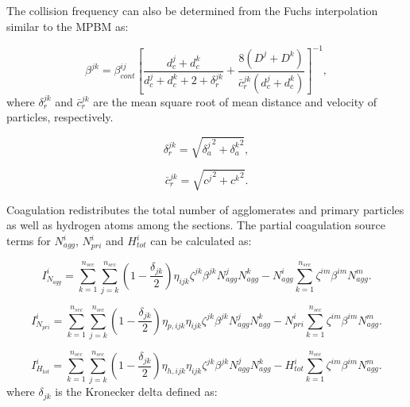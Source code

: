The collision frequency can also be determined from the Fuchs interpolation similar to the MPBM as:

\begin{equation}
	\beta^{jk}=
	\beta^{ij}_{cont}
	\left[
		\frac{d^j_c+d^k_c}{d^j_c+d^k_c+2+\delta^{jk}_r}+
		\frac{8\left(D^j+D^k\right)}
		{\bar{c}^{jk}_r\left(d^j_c+d^k_c\right)}
	\right]^{-1}
	\label{eqn:betafuchssect},
\end{equation}
\noindent where ${\delta^{jk}_r}$ and ${\bar{c}^{jk}_r}$ are the mean square root of mean distance and velocity of particles, respectively.

\begin{equation}
 	\delta^{jk}_r=
	\sqrt{
		{\delta^j_a}^2+{\delta^k_a}^2
	}
 	\label{eqn:sqrtmeandist},
\end{equation}

\begin{equation}
	\bar{c}^{jk}_r=
	\sqrt{
		{c^j}^2+{c^k}^2
	}
	\label{eqn:sqrtmeanvel}.
\end{equation}

Coagulation redistributes the total number of agglomerates and primary particles as well as hydrogen atoms among the sections. The partial coagulation source terms for ${N^i_{agg}}$, ${N^i_{pri}}$ and ${H^i_{tot}}$ can be calculated as:

\begin{equation}
	I^i_{N_{agg}}
	=
	\sum_{k=1}^{n_{sec}}\sum_{j=k}^{n_{sec}}
	\left(
		1-\frac{\delta_{jk}}{2}
	\right)
	\eta_{ijk}\zeta^{jk}\beta^{jk}N^j_{agg}N^k_{agg}
	-
	N^i_{agg}
	\sum_{k=1}^{n_{sec}}\zeta^{im}\beta^{im}N^m_{agg}
	\label{eqn:IcoagNaggsect}.
\end{equation}

\begin{equation}
	I^i_{N_{pri}}
	=
	\sum_{k=1}^{n_{sec}}\sum_{j=k}^{n_{sec}}
	\left(
	1-\frac{\delta_{jk}}{2}
	\right)
	\eta_{p,ijk}\eta_{ijk}\zeta^{jk}\beta^{jk}N^j_{agg}N^k_{agg}
	-
	N^i_{pri}
	\sum_{k=1}^{n_{sec}}\zeta^{im}\beta^{im}N^m_{agg}
	\label{eqn:IcoagNprisect}.
\end{equation}

\begin{equation}
	I^i_{H_{tot}}
	=
	\sum_{k=1}^{n_{sec}}\sum_{j=k}^{n_{sec}}
	\left(
	1-\frac{\delta_{jk}}{2}
	\right)
	\eta_{h,ijk}\eta_{ijk}\zeta^{jk}\beta^{jk}N^j_{agg}N^k_{agg}
	-
	H^i_{tot}
	\sum_{k=1}^{n_{sec}}\zeta^{im}\beta^{im}N^m_{agg}
	\label{eqn:IcoagHtotsect}.
\end{equation}
\noindent where ${\delta_{jk}}$ is the Kronecker delta defined as:

